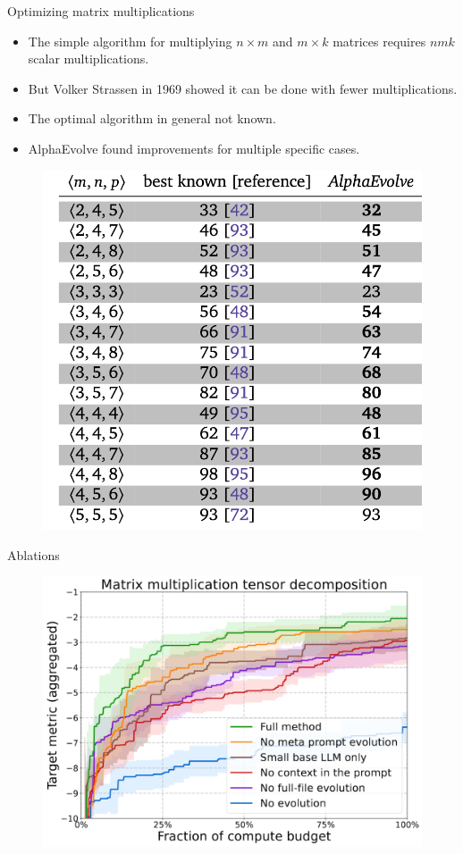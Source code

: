 \documentclass{beamer}
\begin{document}
\begin{frame}{Optimizing matrix multiplications}
\begin{itemize}
\item The simple algorithm for multiplying $n \times m$ and $m \times k$
matrices requires $nmk$ scalar multiplications.
\item But Volker Strassen in 1969 showed it can be done with fewer
multiplications.
\item The optimal algorithm in general not known.
\item AlphaEvolve found improvements for multiple specific cases.
\end{itemize}
\begin{figure}
\centering
\includegraphics[width=0.5\linewidth]{figures/matmul-table.png}
\end{figure}
\end{frame}

\begin{frame}{Ablations}
\begin{figure}
\centering
\includegraphics[width=0.8\linewidth]{figures/alphaevolve-ablations.png}
\end{figure}
\end{frame}
\end{document}
